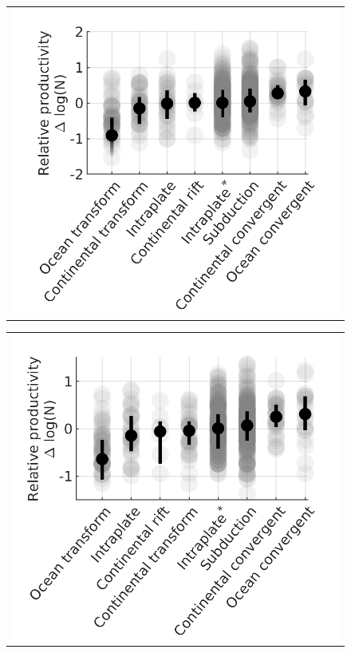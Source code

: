 \documentclass[draft]{agujournal}
\begin{document}
\newpage
\begin{figure}[H]
    \centering
    \begin{tabular}{@{}c@{}}
        \includegraphics{figures/prod_by_pb.png}
    \end{tabular}
    
    \begin{tabular}{@{}c@{}}
        \includegraphics{figures/prod_by_pb_z2008.png}
    \end{tabular}
    

\end{figure}
\end{document}

